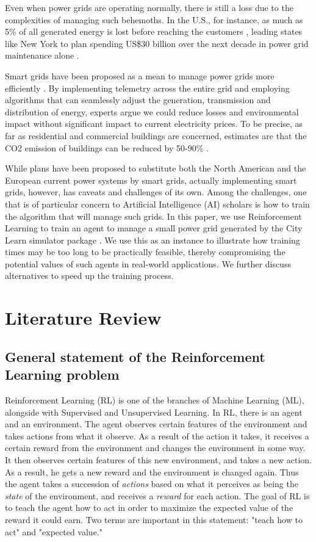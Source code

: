 \documentclass{article}
\begin{document}
Even when power grids are operating normally, there is still a loss due to the complexities of managing such behemoths. In the U.S., for instance, as much as 5\% of all generated energy is lost before reaching the customers \cite{EIA}, leading states like New York to plan spending US\$30 billion over the next decade in power grid maintenance alone \cite{NYSERDA}. 

Smart grids have been proposed as a mean to manage power grids more efficiently \cite{SmartGrid}. By implementing telemetry across the entire grid and employing algorithms that can seamlessly adjust the generation, transmission and distribution of energy, experts argue we could reduce losses and environmental impact without significant impact to current electricity prices. To be precise, as far as residential and commercial buildings are concerned, estimates are that the CO2 emission of buildings can be reduced by 50-90\% \cite{RLEM2020}.

While plans have been proposed to substitute both the North American \cite{SmartGrid-USA} and the European \cite{SmartGrid-EU} current power systems by smart grids, actually implementing smart grids, however, has caveats and challenges of its own. Among the challenges, one that is of particular concern to Artificial Intelligence (AI) scholars is how to train the algorithm that will manage such grids. In this paper, we use Reinforcement Learning to train an agent to manage a small power grid generated by the City Learn simulator package \cite{Vazquez-Canteli2019}. We use this as an instance to illustrate how training times may be too long to be practically feasible, thereby compromising the potential values of such agents in real-world applications. We further discuss alternatives to speed up the training process.

\section{Literature Review}
\subsection{General statement of the Reinforcement Learning problem}

Reinforcement Learning (RL) is one of the branches of Machine Learning (ML), alongside with Supervised and Unsupervised Learning. In RL, there is an agent and an environment. The agent observes certain features of the environment and takes actions from what it observe. As a result of the action it takes, it receives a certain reward from the environment and changes the environment in some way. It then observes certain features of this new environment, and takes a new action. As a result, he gets a new reward and the environment is changed again. Thus the agent takes a succession of \emph{actions} based on what it perceives as being the \emph{state} of the environment, and receives a \emph{reward} for each action. The goal of RL is to teach the agent how to act in order to maximize the expected value of the reward it could earn. Two terms are important in this statement: "teach how to act" and "expected value."
\end{document}
